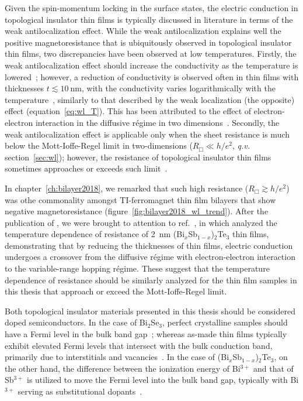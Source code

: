 Given the spin-momentum locking in the surface states, the electric conduction in topological insulator thin films is typically discussed in literature in terms of the weak antilocalization effect. While the weak antilocalization explains well the positive magnetoresistance that is ubiquitously observed in topological insulator thin films, two discrepancies have been observed at low temperatures. Firstly, the weak antilocalization effect should increase the conductivity as the temperature is lowered~\cite{bergmann1984}; however, a reduction of conductivity is observed often in thin films with thicknesses $t \lesssim 10~\mathrm{nm}$, with the conductivity varies logarithmically with the temperature~\cite{Chen2011, Liu2011, Roy2013}, similarly to that described by the weak localization (the opposite) effect (equation~\ref{eq:wl_T}). This has been attributed to the effect of electron-electron interaction in the diffusive r\'egime in two dimensions~\cite{WL_ee}. Secondly, the weak antilocalization effect is applicable only when the sheet resistance is much below the Mott-Ioffe-Regel limit in two-dimensions ($R_\Box \ll h/e^2$, \textit{q.v.} section~\ref{sec:wl}); however, the resistance of topological insulator thin films sometimes approaches or exceeds such limit~\cite{TI_WAL_thickness, ZhangJS2011}.

In chapter~\ref{ch:bilayer2018}, we remarked that such high resistance ($R_\Box \gtrsim h/e^2$) was othe commonality amongst TI-ferromagnet thin film bilayers that show negative magnetoresistance (figure~\ref{fig:bilayer2018_wl_trend}). After the publication of \cite{bilayer2018}, we were brought to attention to ref.~\cite{liao2015}, in which \citeauthor{liao2015} analyzed the temperature dependence of resistance of \SI{2}{nm} (Bi$_x$Sb$_{1-x}$)$_2$Te$_3$ thin films, demonstrating that by reducing the thicknesses of thin films, electric conduction undergoes a crossover from the diffusive r\'egime with electron-electron interaction to the variable-range hopping r\'egime. These suggest that the temperature dependence of resistance should be similarly analyzed for the thin film samples in this thesis that approach or exceed the Mott-Ioffe-Regel limit.

Both topological insulator materials presented in this thesis should be considered doped semiconductors. In the case of Bi$_2$Se$_3$, perfect crystalline samples should have a Fermi level in the bulk band gap~\cite{TI_electronic_structure_zhang}; whereas as-made thin films typically exhibit elevated Fermi levels that intersect with the bulk conduction band, primarily due to interstitials and vacancies~\cite{TI_ARPES1, ARPES_thickness, zhangli2013, Zhanybek3, Fisher2010}. In the case of (Bi$_x$Sb$_{1-x}$)$_2$Te$_3$, on the other hand, the difference between the ionization energy of Bi$^{3+}$ and that of Sb$^{3+}$ is utilized to move the Fermi level into the bulk band gap, typically with Bi$^{3+}$ serving as substitutional dopants~\cite{ZhangJS2011, TI_electronic_structure_zhang}.

